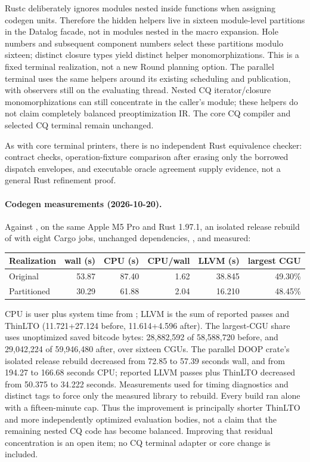 Rustc deliberately ignores modules nested inside functions when assigning
codegen units. Therefore the hidden helpers live in sixteen module-level
partitions in the Datalog facade, not in modules nested in the macro expansion.
Hole numbers and subsequent component numbers select these partitions modulo
sixteen; distinct closure types yield distinct helper monomorphizations.
This is a fixed terminal realization, not a new Round planning option.
The parallel terminal uses the same helpers around its existing scheduling and
publication, with observers still on the evaluating thread.
Nested CQ iterator/closure monomorphizations can still concentrate in the
caller's module; these helpers do not claim completely balanced preoptimization
IR. The core CQ compiler and selected CQ terminal remain unchanged.

As with core terminal printers, there is no independent Rust equivalence
checker: contract checks, operation-fixture comparison after erasing only the
borrowed dispatch envelopes, and executable oracle agreement supply evidence,
not a general Rust refinement proof.

\paragraph{Codegen measurements (2026-10-20).}
Against , on the same Apple M5 Pro and Rust 1.97.1, an isolated
release rebuild of  with eight Cargo jobs, unchanged
dependencies, , and  measured:
\begin{center}
\begin{tabular}{lrrrrr}
\toprule
Realization & wall (s) & CPU (s) & CPU/wall & LLVM (s) & largest CGU\\
\midrule
Original & 53.87 & 87.40 & 1.62 & 38.845 & 49.30\%\\
Partitioned & 30.29 & 61.88 & 2.04 & 16.210 & 48.45\%\\
\bottomrule
\end{tabular}
\end{center}
CPU is user plus system time from ; LLVM is the sum of
reported passes and ThinLTO (11.721+27.124 before, 11.614+4.596 after).
The largest-CGU share uses unoptimized saved bitcode bytes: 28,882,592 of
58,588,720 before, and 29,042,224 of 59,946,480 after, over sixteen CGUs.
The parallel DOOP crate's isolated release rebuild decreased from 72.85 to
57.39 seconds wall, and from 194.27 to 166.68 seconds CPU; reported LLVM
passes plus ThinLTO decreased from 50.375 to 34.222 seconds.
Measurements used  for timing diagnostics and distinct
 tags to force only the measured library to rebuild.
Every build ran alone with a fifteen-minute cap.
Thus the improvement is principally shorter ThinLTO and more independently
optimized evaluation bodies, not a claim that the remaining nested CQ code
has become balanced. Improving that residual concentration is an open item;
no CQ terminal adapter or core change is included.

